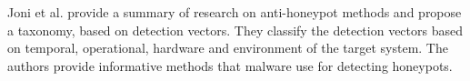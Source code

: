 \documentclass[../main.tex]{subfiles}
\begin{document}
Joni et al. \cite{Joni} provide a  summary of research on anti-honeypot methods and propose a taxonomy, based on detection vectors. They classify the detection vectors based on temporal, operational, hardware and environment of the target system. The authors provide informative methods that malware use for detecting honeypots. 
\end{document}
